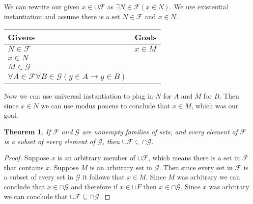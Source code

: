 \documentclass{article}
\newcommand{\n}{ \noindent }
\newcommand{\F}{\mathcal{F}}
\newcommand{\G}{\mathcal{G}}
\newtheorem*{theorem}{Theorem}  %
\begin{document}
\n We can rewrite our given $x \in \cup \F$ as $\exists N \in \F(x \in N)$. We use existential instantiation and assume there is a set $N \in \F$ and $x \in N$.

\begin{table}[h]
\begin{tabular}{ll}
\hline
Givens & Goals   \\ \hline
$N \in \F$ & $x \in M$   \\
$x \in N$ & \\ 
$M \in \G$ & \\
$\forall A \in \F \forall B \in \G(y \in A \rightarrow y \in B)$ & \\ \hline
\end{tabular}
\end{table}

\n Now we can use universal instantiation to plug in $N$ for $A$ and $M$ for $B$. Then since $x \in N$ we can use modus ponens to conclude that $x \in M$, which was our goal.

\begin{theorem} If $\F$ and $\G$ are nonempty families of sets, and every element of $\F$ is a subset of every element of $\G$, then $\cup \F \subseteq \cap \G$.
\end{theorem}
\begin{proof}
Suppose $x$ is an arbitrary member of $\cup \F$, which means there is a set in $\F$ that contains $x$. Suppose $M$ is an arbitrary set in $\G$. Then since every set in $\F$ is a subset of every set in $\G$ it follows that $x \in M$. Since $M$ was arbitrary we can conclude that $x \in \cap \G$ and therefore if $x \in \cup F$ then $x \in \cap \G$. Since $x$ was arbitrary we can conclude that $\cup \F \subseteq \cap \G$.
\end{proof}
\end{document}
